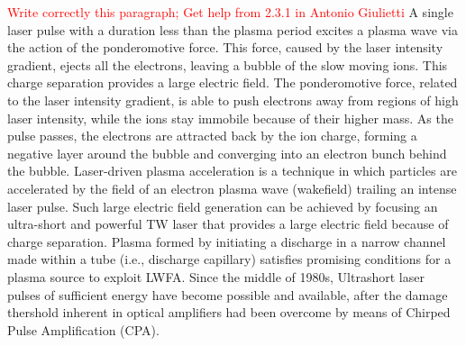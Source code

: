 \documentclass[justified,nofonts,nobib]{tufte-book}
\begin{document}
\textcolor{red}{Write correctly this paragraph; Get help from 2.3.1 in Antonio Giulietti}
A single laser pulse with a duration less than the plasma period excites a plasma wave via the action of the ponderomotive force. This force, caused by the laser intensity gradient, ejects all the electrons, leaving a bubble of the slow moving ions. This charge separation provides a large electric field. The ponderomotive force, related to the laser intensity gradient, is able to push electrons away from regions of high laser intensity, while the ions stay immobile because of their higher mass. As the pulse passes, the electrons are attracted back by the ion charge, forming a negative layer around the bubble and converging into an electron bunch behind the bubble.
Laser-driven plasma acceleration is a technique in which particles are accelerated by the field of an electron plasma wave (wakefield) trailing an intense laser pulse. Such large electric field generation can be achieved by focusing an ultra-short and powerful TW laser that provides a large electric field because of charge separation. Plasma formed by initiating a discharge in a narrow channel made within a tube (i.e., discharge capillary) satisfies promising
conditions for a plasma source to exploit LWFA. Since the middle of 1980s, Ultrashort laser pulses of sufficient energy have become possible and available, after the damage thershold inherent in optical amplifiers had been overcome by means of Chirped Pulse Amplification (CPA)\cite{Strickland1985CompressionPulses}.
\end{document}
